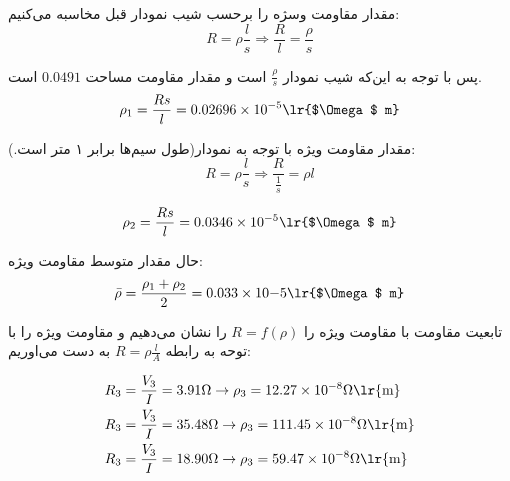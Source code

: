 \documentclass[a4paper, 11pt]{article}
\begin{document}
مقدار مقاومت وسژه را برحسب شیب نمودار قبل مخاسبه می‌کنیم:
\[R=\rho \frac{l}{s} \Rightarrow \frac{R}{l} = \frac{\rho}{s}\]

پس با توجه به این‌که شیب نمودار $\frac{\rho}{s}$ است و مقدار مقاومت مساحت $0.0491$  است.
\[\rho_1 = \frac{Rs}{l} = 0.02696 \times 10^{-5} \text{\lr{$\Omega$ m}}\]

مقدار مقاومت ویژه با توجه به نمودار(طول سیم‌ها برابر ۱ متر است.):
\[R =\rho \frac{l}{s} \Rightarrow \frac{R}{\frac{1}{s}} =\rho l\]

\[\rho_2 = \frac{Rs}{l} = 0.0346 \times 10^{-5} \text{\lr{$\Omega$ m}}\]

حال مقدار متوسط مقاومت ویژه:
\[\bar{\rho} = \frac{\rho_1 + \rho_2}{2} = 0.033 \times 10{-5} \text{\lr{$\Omega$ m}}\]

تابعیت مقاومت با مقاومت ویژه را $R = f(\rho)$ را نشان می‌دهیم و مقاومت ویژه را با توحه به رابطه $R = \rho \frac{l}{A}$ به دست می‌اوریم:

\[
\begin{aligned}
R_3 & = \frac{V_3}{I} = 3.91 \Omega \rightarrow \rho_3 = 12.27 \times 10 ^{-8} \Omega \text{\lr{m}} \\
R_3 & = \frac{V_3}{I} = 35.48 \Omega \rightarrow \rho_3 = 111.45 \times 10 ^{-8} \Omega \text{\lr{m}} \\
R_3 & = \frac{V_3}{I} = 18.90 \Omega \rightarrow \rho_3 = 59.47 \times 10 ^{-8} \Omega \text{\lr{m}} \\
\end{aligned}
\]
\end{document}
